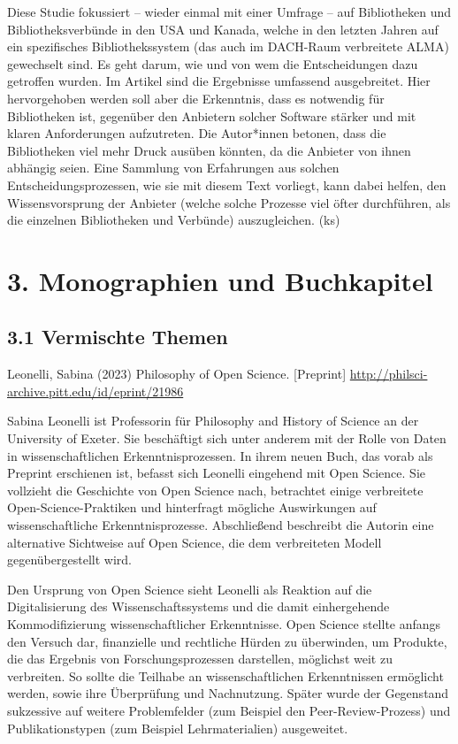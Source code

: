 \documentclass[a4paper,
fontsize=11pt,
oneside,
numbers=noperiodatend,
parskip=half-,
bibliography=totoc,
final
]{scrartcl}
\begin{document}
Diese Studie fokussiert -- wieder einmal mit einer Umfrage -- auf
Bibliotheken und Bibliotheksverbünde in den USA und Kanada, welche in
den letzten Jahren auf ein spezifisches Bibliothekssystem (das auch im
DACH-Raum verbreitete ALMA) gewechselt sind. Es geht darum, wie und von
wem die Entscheidungen dazu getroffen wurden. Im Artikel sind die
Ergebnisse umfassend ausgebreitet. Hier hervorgehoben werden soll aber
die Erkenntnis, dass es notwendig für Bibliotheken ist, gegenüber den
Anbietern solcher Software stärker und mit klaren Anforderungen
aufzutreten. Die Autor*innen betonen, dass die Bibliotheken viel mehr
Druck ausüben könnten, da die Anbieter von ihnen abhängig seien. Eine
Sammlung von Erfahrungen aus solchen Entscheidungsprozessen, wie sie mit
diesem Text vorliegt, kann dabei helfen, den Wissensvorsprung der
Anbieter (welche solche Prozesse viel öfter durchführen, als die
einzelnen Bibliotheken und Verbünde) auszugleichen. (ks)

\hypertarget{monographien-und-buchkapitel}{%
\section{3. Monographien und
Buchkapitel}\label{monographien-und-buchkapitel}}

\hypertarget{vermischte-themen-1}{%
\subsection{3.1 Vermischte Themen}\label{vermischte-themen-1}}

Leonelli, Sabina (2023) Philosophy of Open Science. {[}Preprint{]}
\url{http://philsci-archive.pitt.edu/id/eprint/21986}

Sabina Leonelli ist Professorin für Philosophy and History of Science an
der University of Exeter. Sie beschäftigt sich unter anderem mit der
Rolle von Daten in wissenschaftlichen Erkenntnisprozessen. In ihrem
neuen Buch, das vorab als Preprint erschienen ist, befasst sich Leonelli
eingehend mit Open Science. Sie vollzieht die Geschichte von Open
Science nach, betrachtet einige verbreitete Open-Science-Praktiken und
hinterfragt mögliche Auswirkungen auf wissenschaftliche
Erkenntnisprozesse. Abschließend beschreibt die Autorin eine alternative
Sichtweise auf Open Science, die dem verbreiteten Modell
gegenübergestellt wird.

Den Ursprung von Open Science sieht Leonelli als Reaktion auf die
Digitalisierung des Wissenschaftssystems und die damit einhergehende
Kommodifizierung wissenschaftlicher Erkenntnisse. Open Science stellte
anfangs den Versuch dar, finanzielle und rechtliche Hürden zu
überwinden, um Produkte, die das Ergebnis von Forschungsprozessen
darstellen, möglichst weit zu verbreiten. So sollte die Teilhabe an
wissenschaftlichen Erkenntnissen ermöglicht werden, sowie ihre
Überprüfung und Nachnutzung. Später wurde der Gegenstand sukzessive auf
weitere Problemfelder (zum Beispiel den Peer-Review-Prozess) und
Publikationstypen (zum Beispiel Lehrmaterialien) ausgeweitet.
\end{document}
